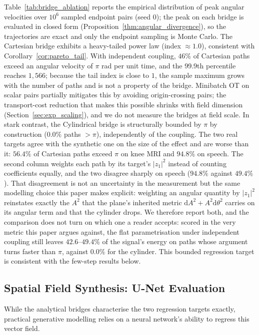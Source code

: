 Table~\ref{tab:bridge_ablation} reports the empirical distribution of peak angular velocities over $10^6$ sampled endpoint pairs (seed $0$); the peak on each bridge is evaluated in closed form (Proposition~\ref{thm:angular_divergence}), so the trajectories are exact and only the endpoint sampling is Monte Carlo. The Cartesian bridge exhibits a heavy-tailed power law (index $\approx 1.0$), consistent with Corollary~\ref{cor:pareto_tail}. With independent coupling, $46\%$ of Cartesian paths exceed an angular velocity of $\pi$ rad per unit time, and the 99.9th percentile reaches $1{,}566$; because the tail index is close to $1$, the sample maximum grows with the number of paths and is not a property of the bridge. Minibatch OT on scalar pairs partially mitigates this by avoiding origin-crossing pairs; the transport-cost reduction that makes this possible shrinks with field dimension (Section~\ref{sec:exp_scaling}), and we do not measure the bridges at field scale. In stark contrast, the Cylindrical bridge is structurally bounded by $\pi$ by construction ($0.0\%$ paths $> \pi$), independently of the coupling. The two real targets agree with the synthetic one on the size of the effect and are worse than it: $56.4\%$ of Cartesian paths exceed $\pi$ on knee MRI and $94.8\%$ on speech. The second column weights each path by its target's $|z_1|^2$ instead of counting coefficients equally, and the two disagree sharply on speech ($94.8\%$ against $49.4\%$). That disagreement is not an uncertainty in the measurement but the same modelling choice this paper makes explicit: weighting an angular quantity by $|z_1|^2$ reinstates exactly the $A^2$ that the plane's inherited metric $\mathrm{d}A^2 + A^2\mathrm{d}\theta^2$ carries on its angular term and that the cylinder drops. We therefore report both, and the comparison does not turn on which one a reader accepts: scored in the very metric this paper argues against, the flat parametrisation under independent coupling still leaves $42.6$--$49.4\%$ of the signal's energy on paths whose argument turns faster than $\pi$, against $0.0\%$ for the cylinder. This bounded regression target is consistent with the few-step results below.

\subsection{Spatial Field Synthesis: U-Net Evaluation}
\label{sec:exp_unet_baseline}



While the analytical bridges characterise the two regression targets exactly, practical generative modelling relies on a neural network's ability to regress this vector field.

